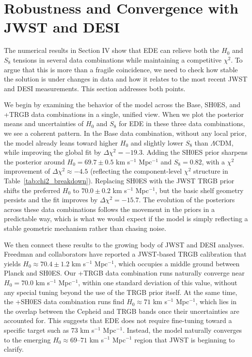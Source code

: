 \documentclass[a4paper,11pt]{article}
\begin{document}

\section{Robustness and Convergence with JWST and DESI}

The numerical results in Section IV show that EDE can relieve both the $H_0$ and $S_8$ tensions in several data combinations while maintaining a competitive $\chi^2$. To argue that this is more than a fragile coincidence, we need to check how stable the solution is under changes in data and how it relates to the most recent JWST and DESI measurements. This section addresses both points.

We begin by examining the behavior of the model across the Base, SH0ES, and +TRGB data combinations in a single, unified view. When we plot the posterior means and uncertainties of $H_0$ and $S_8$ for EDE in these three data combinations, we see a coherent pattern. In the Base data combination, without any local prior, the model already leans toward higher $H_0$ and slightly lower $S_8$ than $\Lambda$CDM, while improving the global fit by $\Delta\chi^2 = -19.3$. Adding the SH0ES prior sharpens the posterior around $H_0 = 69.7 \pm 0.5$ km s$^{-1}$ Mpc$^{-1}$ and $S_8 = 0.82$, with a $\chi^2$ improvement of $\Delta\chi^2 \approx -4.5$ (reflecting the component-level $\chi^2$ structure in Table~\ref{tab:chi2_breakdown}). Replacing SH0ES with the JWST TRGB prior shifts the preferred $H_0$ to $70.0 \pm 0.2$ km s$^{-1}$ Mpc$^{-1}$, but the basic shelf geometry persists and the fit improves by $\Delta\chi^2 = -15.7$. The evolution of the posteriors across these data combinations follows the movement in the priors in a predictable way, which is what we would expect if the model is simply reflecting a stable geometric mechanism rather than chasing noise.

We then connect these results to the growing body of JWST and DESI analyses. Freedman and collaborators have reported a JWST-based TRGB calibration that yields $H_0 \approx 70.4 \pm 1.2$ km s$^{-1}$ Mpc$^{-1}$, which occupies a middle ground between Planck and SH0ES. Our +TRGB data combination runs naturally converge near $H_0 = 70.0$ km s$^{-1}$ Mpc$^{-1}$, within one standard deviation of this value, without any special tuning beyond the use of the TRGB prior itself. At the same time, the +SH0ES data combination runs find $H_0 \approx 71$ km s$^{-1}$ Mpc$^{-1}$, which lies in the overlap between the Cepheid and TRGB bands once their uncertainties are accounted for. This suggests that EDE does not require fine-tuning toward a specific target such as $73$ km s$^{-1}$ Mpc$^{-1}$. Instead, the model naturally converges to the emerging $H_0 \approx 69$--$71$ km s$^{-1}$ Mpc$^{-1}$ region that JWST is beginning to clarify.
\end{document}
